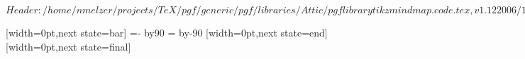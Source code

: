 \ProvidesPackageRCS[v\pgfversion] $Header: /home/nmelzer/projects/TeX/pgf/generic/pgf/libraries/Attic/pgflibrarytikzmindmap.code.tex,v 1.12 2006/10/04 16:32:22 tantau Exp $

%




%

{
  [width=0pt,next state=bar]
  {
    {
    \pgftransformxshift{-\pgfsnakecirclestartradius}%
    \pgfpathmoveto{\pgfpointpolar{\pgfsnakesegmentangle}{\pgfsnakecirclestartradius}}
    \pgfpatharc{\pgfsnakesegmentangle}{-\pgfsnakesegmentangle}{\pgfsnakecirclestartradius}
    \@tempcnta=-\pgfsnakesegmentangle\relax
    \advance\@tempcnta by90\relax
    \setlength\@tempdima{\pgfsnakecirclestartradius}
    \setlength\@tempdimb{\pgfsnakesegmentamplitude}
    \pgfpathcurveto
    {\pgfpointadd
      {\pgfpointpolar{-\pgfsnakesegmentangle}{\pgfsnakecirclestartradius}}
      {}}
    {}
    {}
    \@tempcnta=\pgfsnakesegmentangle\relax
    \advance\@tempcnta by-90\relax
    \pgfpathcurveto
    {}
    {\pgfpointadd
      {\pgfpointpolar{\pgfsnakesegmentangle}{\pgfsnakecirclestartradius}}
      {}}
    {\pgfpointpolar{\pgfsnakesegmentangle}{\pgfsnakecirclestartradius}}
    \pgfpathclose
    }
  }
  [width=0pt,next state=end]
  {
    \setlength\@tempdima{\pgfsnakecirclestartradius}%
    \setlength\@tempdimb{\pgfsnakecircleendradius}%
    \setlength\pgf@xc{\pgfsnakesegmentamplitude}%
    \pgfpathrectangle
    {}
    {}
  }
  [width=0pt,next state=final]
  {
    {
    \pgftransformxshift{\pgfsnakeremainingdistance}%
    \pgftransformxshift{-\pgfsnakecircleendradius}%
    \pgfpathmoveto{\pgfpointpolar{\pgfsnakesegmentangle}{\pgfsnakecircleendradius}}
    \pgfpatharc{\pgfsnakesegmentangle}{-\pgfsnakesegmentangle}{\pgfsnakecircleendradius}
}}}
